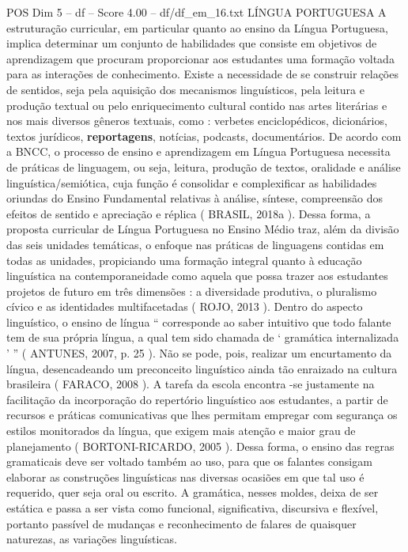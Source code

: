 \begin{textsample}{POS Dim 5 – df – Score 4.00 – df/df\_em\_16.txt}  \label{ex:f5_pos_156}
LÍNGUA PORTUGUESA A estruturação curricular, em particular quanto ao ensino da Língua Portuguesa, implica determinar um conjunto de habilidades que consiste em objetivos de aprendizagem que procuram proporcionar aos estudantes uma formação voltada para as interações de conhecimento.
Existe a necessidade de se construir relações de sentidos, seja pela aquisição dos mecanismos linguísticos, pela leitura e produção textual ou pelo enriquecimento cultural contido nas artes literárias e nos mais diversos gêneros textuais, como : verbetes enciclopédicos, dicionários, textos jurídicos, \textbf{reportagens}, notícias, podcasts, documentários.
De acordo com a BNCC, o processo de ensino e aprendizagem em Língua Portuguesa necessita de práticas de linguagem, ou seja, leitura, produção de textos, oralidade e análise linguística/semiótica, cuja função é consolidar e complexificar as habilidades oriundas do Ensino Fundamental relativas à análise, síntese, compreensão dos efeitos de sentido e apreciação e réplica ( BRASIL, 2018a ).
Dessa forma, a proposta curricular de Língua Portuguesa no Ensino Médio traz, além da divisão das seis unidades temáticas, o enfoque nas práticas de linguagens contidas em todas as unidades, propiciando uma formação integral quanto à educação linguística na contemporaneidade como aquela que possa trazer aos estudantes projetos de futuro em três dimensões : a diversidade produtiva, o pluralismo cívico e as identidades multifacetadas ( ROJO, 2013 ).
Dentro do aspecto linguístico, o ensino de língua “ corresponde ao saber intuitivo que todo falante tem de sua própria língua, a qual tem sido chamada de ‘ gramática internalizada ’ ” ( ANTUNES, 2007, p. 25 ).
Não se pode, pois, realizar um encurtamento da língua, desencadeando um preconceito linguístico ainda tão enraizado na cultura brasileira ( FARACO, 2008 ).
A tarefa da escola encontra -se justamente na facilitação da incorporação do repertório linguístico aos estudantes, a partir de recursos e práticas comunicativas que lhes permitam empregar com segurança os estilos monitorados da língua, que exigem mais atenção e maior grau de planejamento ( BORTONI-RICARDO, 2005 ).
Dessa forma, o ensino das regras gramaticais deve ser voltado também ao uso, para que os falantes consigam elaborar as construções linguísticas nas diversas ocasiões em que tal uso é requerido, quer seja oral ou escrito.
A gramática, nesses moldes, deixa de ser estática e passa a ser vista como funcional, significativa, discursiva e flexível, portanto passível de mudanças e reconhecimento de falares de quaisquer naturezas, as variações linguísticas.

\end{textsample}
